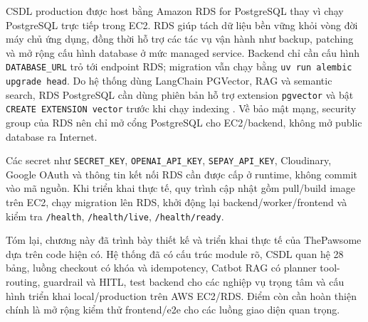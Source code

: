 \documentclass[../DoAn.tex]{subfiles}
\begin{document}
CSDL production được host bằng Amazon RDS for PostgreSQL thay vì chạy PostgreSQL trực tiếp trong EC2. RDS giúp tách dữ liệu bền vững khỏi vòng đời máy chủ ứng dụng, đồng thời hỗ trợ các tác vụ vận hành như backup, patching và mở rộng cấu hình database ở mức managed service. Backend chỉ cần cấu hình \texttt{DATABASE\_URL} trỏ tới endpoint RDS; migration vẫn chạy bằng \texttt{uv run alembic upgrade head}. Do hệ thống dùng LangChain PGVector, RAG và semantic search, RDS PostgreSQL cần dùng phiên bản hỗ trợ extension \texttt{pgvector} và bật \texttt{CREATE EXTENSION vector} trước khi chạy indexing \cite{awsRdsPgvectorDocs}. Về bảo mật mạng, security group của RDS nên chỉ mở cổng PostgreSQL cho EC2/backend, không mở public database ra Internet.

Các secret như \texttt{SECRET\_KEY}, \texttt{OPENAI\_API\_KEY}, \texttt{SEPAY\_API\_KEY}, Cloudinary, Google OAuth và thông tin kết nối RDS cần được cấp ở runtime, không commit vào mã nguồn. Khi triển khai thực tế, quy trình cập nhật gồm pull/build image trên EC2, chạy migration lên RDS, khởi động lại backend/worker/frontend và kiểm tra \texttt{/health}, \texttt{/health/live}, \texttt{/health/ready}.

Tóm lại, chương này đã trình bày thiết kế và triển khai thực tế của ThePawsome dựa trên code hiện có. Hệ thống đã có cấu trúc module rõ, CSDL quan hệ 28 bảng, luồng checkout có khóa và idempotency, Catbot RAG có planner tool-routing, guardrail và HITL, test backend cho các nghiệp vụ trọng tâm và cấu hình triển khai local/production trên AWS EC2/RDS. Điểm còn cần hoàn thiện chính là mở rộng kiểm thử frontend/e2e cho các luồng giao diện quan trọng.
\end{document}
